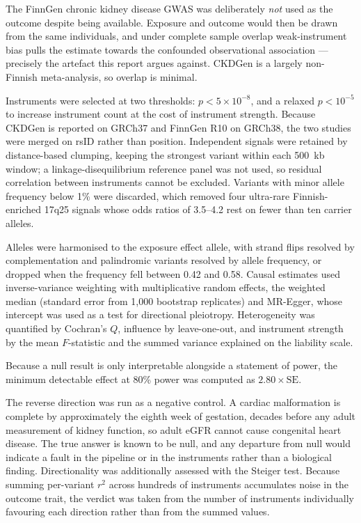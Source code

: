 \documentclass[11pt,a4paper]{article}
\begin{document}
The FinnGen chronic kidney disease GWAS was deliberately \emph{not} used as the outcome
despite being available. Exposure and outcome would then be drawn from the same individuals,
and under complete sample overlap weak-instrument bias pulls the estimate towards the
confounded observational association --- precisely the artefact this report argues against.
CKDGen is a largely non-Finnish meta-analysis, so overlap is minimal.

Instruments were selected at two thresholds: $p < 5\times10^{-8}$, and a relaxed
$p < 10^{-5}$ to increase instrument count at the cost of instrument strength. Because CKDGen
is reported on GRCh37 and FinnGen R10 on GRCh38, the two studies were merged on rsID rather
than position. Independent signals were retained by distance-based clumping, keeping the
strongest variant within each 500~kb window; a linkage-disequilibrium reference panel was not
used, so residual correlation between instruments cannot be excluded. Variants with minor
allele frequency below 1\% were discarded, which removed four ultra-rare Finnish-enriched
17q25 signals whose odds ratios of 3.5--4.2 rest on fewer than ten carrier alleles.

Alleles were harmonised to the exposure effect allele, with strand flips resolved by
complementation and palindromic variants resolved by allele frequency, or dropped when the
frequency fell between 0.42 and 0.58. Causal estimates used inverse-variance weighting with
multiplicative random effects, the weighted median (standard error from 1,000 bootstrap
replicates) and MR-Egger, whose intercept was used as a test for directional pleiotropy.
Heterogeneity was quantified by Cochran's $Q$, influence by leave-one-out, and instrument
strength by the mean $F$-statistic and the summed variance explained on the liability scale.

Because a null result is only interpretable alongside a statement of power, the minimum
detectable effect at 80\% power was computed as $2.80 \times \mathrm{SE}$.

The reverse direction was run as a negative control. A cardiac malformation is complete by
approximately the eighth week of gestation, decades before any adult measurement of kidney
function, so adult eGFR cannot cause congenital heart disease. The true answer is known to be
null, and any departure from null would indicate a fault in the pipeline or in the
instruments rather than a biological finding. Directionality was additionally assessed with
the Steiger test. Because summing per-variant $r^2$ across hundreds of instruments
accumulates noise in the outcome trait, the verdict was taken from the number of instruments
individually favouring each direction rather than from the summed values.
\end{document}

